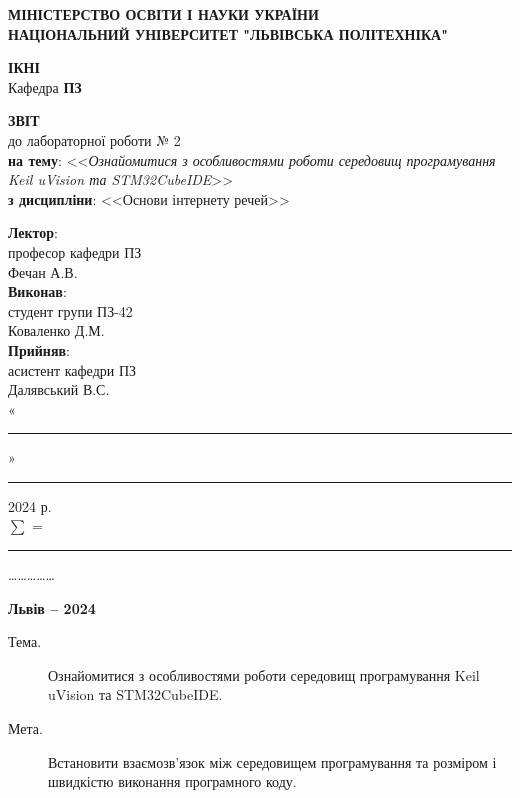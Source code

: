 \documentclass[oneside,14pt]{extarticle}
\newcommand\subject{Основи інтернету речей}
\newcommand\lecturer{професор кафедри ПЗ\\Фечан А.В.}
\newcommand\teacher{асистент кафедри ПЗ\\Далявський В.С.}
\newcommand\mygroup{ПЗ-42}
\newcommand\lab{2}
\newcommand\theme{Ознайомитися з особливостями роботи середовищ програмування Keil uVision та
	STM32CubeIDE}
\newcommand\purpose{Встановити взаємозв’язок між середовищем програмування та розміром і швидкістю
	виконання програмного коду}
\begin{document}
\begin{normalsize}
	\begin{titlepage}
		\thispagestyle{empty}
		\begin{center}
			\textbf{МІНІСТЕРСТВО ОСВІТИ І НАУКИ УКРАЇНИ\\
				НАЦІОНАЛЬНИЙ УНІВЕРСИТЕТ "ЛЬВІВСЬКА ПОЛІТЕХНІКА"}
		\end{center}
		\begin{flushright}
			\textbf{ІКНІ}\\
			Кафедра \textbf{ПЗ}
		\end{flushright}
		\vspace{80pt}
		\begin{center}
			\textbf{ЗВІТ}\\
			\vspace{10pt}
			до лабораторної роботи № \lab\\
			\textbf{на тему}: <<\textit{\theme}>>\\
			\textbf{з дисципліни}: <<\subject>>
		\end{center}
		\vspace{80pt}
		\begin{flushright}
			
			\textbf{Лектор}:\\
			\lecturer\\
			\vspace{28pt}
			\textbf{Виконав}:\\
			
			студент групи \mygroup\\
			Коваленко Д.М.\\
			\vspace{28pt}
			\textbf{Прийняв}:\\
			
			\teacher\\
			
			\vspace{28pt}
			«\rule{1cm}{0.15mm}» \rule{1.5cm}{0.15mm} 2024 р.\\
			$\sum$ = \rule{1cm}{0.15mm}……………\\
			
		\end{flushright}
		\vspace{\fill}
		\begin{center}
			\textbf{Львів – 2024}
		\end{center}
	\end{titlepage}
		
	\begin{description}
		\item[Тема.] \theme.
		\item[Мета.] \purpose.
	\end{description}


\end{normalsize}
\end{document}
